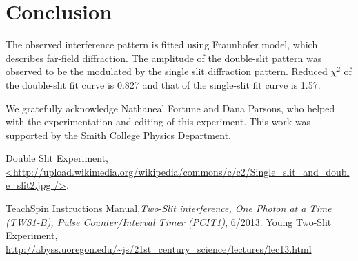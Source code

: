 \documentclass[prb,preprint]{revtex4-1}
\begin{document}
\section{Conclusion}

 The observed interference pattern is fitted using Fraunhofer model, which describes far-field diffraction. The amplitude of the double-slit pattern was observed to be the modulated by the single slit diffraction pattern. Reduced $\chi^2$ of the double-slit fit curve is 0.827 and that of the single-slit fit curve is 1.57.


\begin{acknowledgments}

We gratefully acknowledge Nathaneal Fortune and Dana Parsons, who helped with the experimentation and editing of this experiment.  This work was supported by the Smith College Physics Department.

\end{acknowledgments}


\begin{thebibliography}{99}

 Double Slit Experiment, \url{<http://upload.wikimedia.org/wikipedia/commons/c/c2/Single_slit_and_double_slit2.jpg
/>}.

 TeachSpin Instructions Manual,\textit{Two-Slit interference, One Photon at a Time (TWS1-B), Pulse Counter/Interval Timer (PCIT1)}, 6/2013.
 Young Two-Slit Experiment, \url{http://abyss.uoregon.edu/~js/21st_century_science/lectures/lec13.html}

\end{thebibliography}

\end{document}
